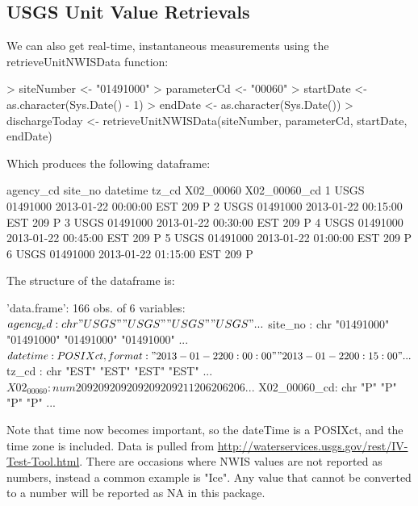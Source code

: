 \documentclass[a4paper,11pt]{article}
\begin{document}
\subsection{USGS Unit Value Retrievals}
We can also get real-time, instantaneous measurements using the retrieveUnitNWISData function:
\begin{Schunk}
\begin{Sinput}
> siteNumber <- "01491000"
> parameterCd <- "00060"
> startDate <- as.character(Sys.Date() - 1)
> endDate <- as.character(Sys.Date())
> dischargeToday <- retrieveUnitNWISData(siteNumber, parameterCd, 
     startDate, endDate)
\end{Sinput}
\end{Schunk}
Which produces the following dataframe:
\begin{Schunk}
\begin{Soutput}
  agency_cd  site_no            datetime tz_cd X02_00060 X02_00060_cd
1      USGS 01491000 2013-01-22 00:00:00   EST       209            P
2      USGS 01491000 2013-01-22 00:15:00   EST       209            P
3      USGS 01491000 2013-01-22 00:30:00   EST       209            P
4      USGS 01491000 2013-01-22 00:45:00   EST       209            P
5      USGS 01491000 2013-01-22 01:00:00   EST       209            P
6      USGS 01491000 2013-01-22 01:15:00   EST       209            P
\end{Soutput}
\end{Schunk}
The structure of the dataframe is:
\begin{Schunk}
\begin{Soutput}
'data.frame':	166 obs. of  6 variables:
 $ agency_cd   : chr  "USGS" "USGS" "USGS" "USGS" ...
 $ site_no     : chr  "01491000" "01491000" "01491000" "01491000" ...
 $ datetime    : POSIXct, format: "2013-01-22 00:00:00" "2013-01-22 00:15:00" ...
 $ tz_cd       : chr  "EST" "EST" "EST" "EST" ...
 $ X02_00060   : num  209 209 209 209 209 209 211 206 206 206 ...
 $ X02_00060_cd: chr  "P" "P" "P" "P" ...
\end{Soutput}
\end{Schunk}
Note that time now becomes important, so the dateTime is a POSIXct, and the time zone is included. Data is pulled from \url{http://waterservices.usgs.gov/rest/IV-Test-Tool.html}. There are occasions where NWIS values are not reported as numbers, instead a common example is "Ice".  Any value that cannot be converted to a number will be reported as NA in this package.
\end{document}
